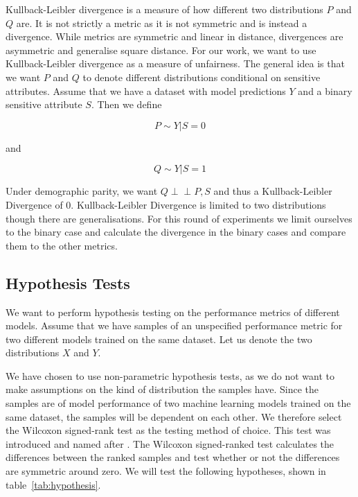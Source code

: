 Kullback-Leibler divergence is a measure of how different two distributions $P$ and $Q$ are. It is not strictly a metric as it is not symmetric and is instead a divergence. While metrics are symmetric and linear in distance, divergences are asymmetric and generalise square distance. For our work, we want to use Kullback-Leibler divergence as a measure of unfairness. The general idea is that we want $P$ and $Q$ to denote different distributions conditional on sensitive attributes. Assume that we have a dataset with model predictions $Y$ and a binary sensitive attribute $S$. Then we define 

\begin{equation*}
    P \sim Y | S = 0
\end{equation*}

and

\begin{equation*}
    Q \sim Y | S = 1
\end{equation*}

Under demographic parity, we want $Q \perp\!\!\!\perp P , S$ and thus a Kullback-Leibler Divergence of 0. Kullback-Leibler Divergence is limited to two distributions though there are generalisations. For this round of experiments we limit ourselves to the binary case and calculate the divergence in the binary cases and compare them to the other metrics.

\subsection{Hypothesis Tests}

We want to perform hypothesis testing on the performance metrics of different models. Assume that we have samples of an unspecified performance metric for two different models trained on the same dataset. Let us denote the two distributions $X$ and $Y$. 

We have chosen to use non-parametric hypothesis tests, as we do not want to make assumptions on the kind of distribution the samples have. Since the samples are of model performance of two machine learning models trained on the same dataset, the samples will be dependent on each other. We therefore select the Wilcoxon signed-rank test as the testing method of choice. This test was introduced and named after \citet{Wilcoxon:1945:Biometrics}. The Wilcoxon signed-ranked test calculates the differences between the ranked samples and test whether or not the differences are symmetric around zero. We will test the following hypotheses, shown in table~\ref{tab:hypothesis}.

